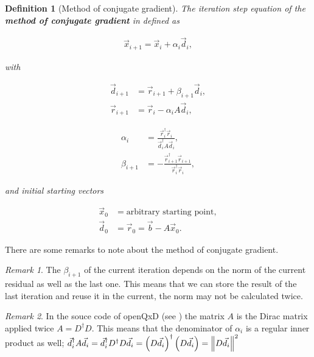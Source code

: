 \documentclass{article}
\theoremstyle{plain} %
\newtheorem{definition}{Definition}[section]
\theoremstyle{remark} %
\newtheorem*{remark}{Remark} %
\def\df#1{\textbf{\textit{#1}}}
\numberwithin{equation}{section}
\begin{document}
\begin{definition}[Method of conjugate gradient]

The iteration step equation of the \df{method of conjugate gradient} in defined as

\begin{align*}
    \vec{x}_{i+1} = \vec{x}_i + \alpha_i \vec{d}_i,
\end{align*}

with

\noindent\begin{minipage}{.5\linewidth}
    \begin{align*}
        \vec{d}_{i+1} &= \vec{r}_{i+1} + \beta_{i+1} \vec{d}_i, \\
        \vec{r}_{i+1} &= \vec{r}_{i}   - \alpha_i A  \vec{d}_i,
    \end{align*}
\end{minipage}
\begin{minipage}{.5\linewidth}
    \begin{align}
        \alpha_i    &=   \frac{ \vec{r}_{i}^{\dagger} \vec{r}_{i} }{ \vec{d}_i^{\dagger} A \vec{d}_i }, \label{eq:alphai} \\
        \beta_{i+1} &= - \frac{ \vec{r}_{i+1}^{\dagger} \vec{r}_{i+1} }{ \vec{r}_{i}^{\dagger} \vec{r}_{i} }, \label{eq:betai}
    \end{align}
\end{minipage}

and initial starting vectors

\begin{align*}
    \vec{x}_{0} &= \text{arbitrary starting point}, \\
    \vec{d}_{0} &= \vec{r}_{0} = \vec{b} - A \vec{x}_0.
\end{align*}

\end{definition}

There are some remarks to note about the method of conjugate gradient.

\begin{remark}
    The $\beta_{i+1}$ of the current iteration depends on the norm of the current residual as well as the last one. This means that we can store the result of the last iteration and reuse it in the current, the norm may not be calculated twice.
\end{remark}

\begin{remark}
    In the souce code of openQxD (see \cite{openqxd}) the matrix $A$ is the Dirac matrix applied twice $A = D^{\dagger} D$. This means that the denominator of $\alpha_i$ is a regular inner product as well; $\vec{d}_i^{\dagger} A \vec{d}_i = \vec{d}_i^{\dagger} D^{\dagger} D \vec{d}_i = \left( D \vec{d}_i \right)^{\dagger} \left( D \vec{d}_i \right) = \norm{ D \vec{d}_i }^2$
\end{remark}
\end{document}
